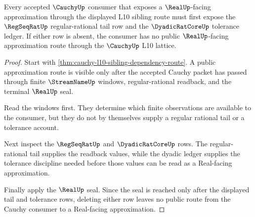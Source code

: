 \begin{theorem}
\label{thm:cauchy-route-regseqrat-tail-inversion}
Every accepted $\CauchyUp$ consumer that exposes a $\RealUp$-facing approximation through the displayed L10 sibling route must first expose the $\RegSeqRatUp$ regular-rational tail row and the $\DyadicRatCoreUp$ tolerance ledger. If either row is absent, the consumer has no public $\RealUp$-facing approximation route through the $\CauchyUp$ L10 lattice.
\end{theorem}
\begin{proof}
Start with \autoref{thm:cauchy-l10-sibling-dependency-route}. A public approximation route is visible only after the accepted Cauchy packet has passed through finite $\StreamNameUp$ windows, regular-rational readback, and the terminal $\RealUp$ seal.

Read the windows first. They determine which finite observations are available to the consumer, but they do not by themselves supply a regular rational tail or a tolerance account.

Next inspect the $\RegSeqRatUp$ and $\DyadicRatCoreUp$ rows. The regular-rational tail supplies the readback values, while the dyadic ledger supplies the tolerance discipline needed before those values can be read as a Real-facing approximation.

Finally apply the $\RealUp$ seal. Since the seal is reached only after the displayed tail and tolerance rows, deleting either row leaves no public route from the Cauchy consumer to a Real-facing approximation.
\end{proof}
